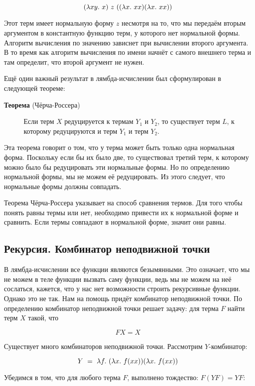 \[(\lambda x y .\  x)\ z\ ((\lambda x .\  xx) (\lambda x .\  xx))\]

Этот терм имеет нормальную форму $z$ несмотря на то, что мы передаём
вторым аргументом в константную функцию терм, у которого нет нормальной
формы. Алгоритм вычисления по значению зависнет при вычислении второго
аргумента. В то время как алгоритм вычисления по имени начнёт с самого
внешнего терма и там определит, что второй аргумент не нужен.

Ещё один важный результат в лямбда-исчислении был сформулирован в
следующей теореме:

\begin{description}
\item[\textbf{Теорема} (Чёрча-Россера)]
Если терм $X$ редуцируется к термам $Y_1$ и $Y_2$, то существует терм
$L$, к которому редуцируются и терм $Y_1$ и терм $Y_2$.
\end{description}

Эта теорема говорит о том, что у терма может быть только одна нормальная
форма. Поскольку если бы их было две, то существовал третий терм, к
которому можно было бы редуцировать эти нормальные формы. Но по
определению нормальной формы, мы не можем её редуцировать. Из этого
следует, что нормальные формы должны совпадать.

Теорема Чёрча-Россера указывает на способ сравнения термов. Для того
чтобы понять равны термы или нет, необходимо привести их к нормальной
форме и сравнить. Если термы совпадают в нормальной форме, значит они
равны.

\subsection{Рекурсия. Комбинатор неподвижной точки}

В лямбда-исчислении все функции являются безымянными. Это означает, что
мы не можем в теле функции вызвать саму функции, ведь мы не можем на неё
сослаться, кажется, что у нас нет возможности строить рекурсивные
функции. Однако это не так. Нам на помощь придёт комбинатор неподвижной
точки. По определению комбинатор неподвижной точки решает задачу: для
терма $F$ найти терм $X$ такой, что

\[F X = X\]

Существует много комбинаторов неподвижной точки. Рассмотрим
$Y$-комбинатор:

\[Y\ =\ \lambda f .\  (\lambda x .\  f(xx)) (\lambda x .\  f(xx))\]

Убедимся в том, что для любого терма $F$, выполнено тождество:
$F(YF) = YF$:

